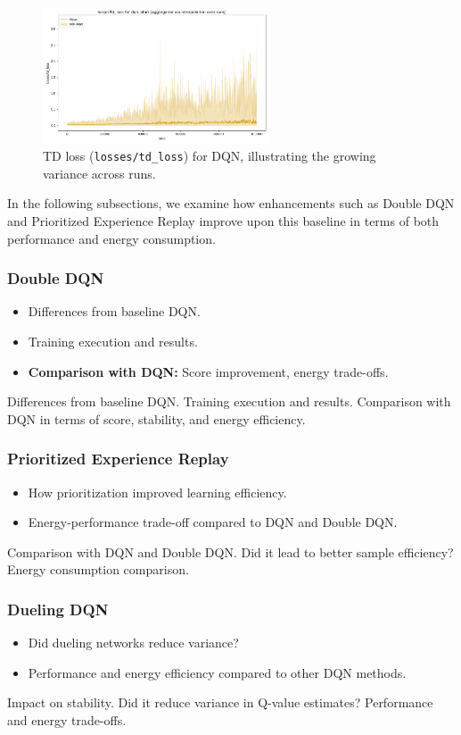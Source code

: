 \begin{figure}[htbp]
	\centering
	\includegraphics[width=0.6\textwidth]{figures/losses_td_loss_dqn_atari.png}
	\caption{TD loss (\texttt{losses/td\_loss}) for DQN, illustrating the growing variance across runs.}
	\label{fig:dqn_td_loss}
\end{figure}

\noindent In the following subsections, we examine how enhancements such as Double DQN and Prioritized Experience Replay improve upon this baseline in terms of both performance and energy consumption.


\subsubsection{Double DQN}
\label{subsubsec:ddqn}
\begin{itemize}
	\item Differences from baseline DQN.
	\item Training execution and results.
	\item \textbf{Comparison with DQN:} Score improvement, energy trade-offs.
\end{itemize}
Differences from baseline DQN.
Training execution and results.
Comparison with DQN in terms of score, stability, and energy efficiency.


\subsubsection{Prioritized Experience Replay}
\begin{itemize}
	\item How prioritization improved learning efficiency.
	\item Energy-performance trade-off compared to DQN and Double DQN.
\end{itemize}
Comparison with DQN and Double DQN.
Did it lead to better sample efficiency?
Energy consumption comparison.


\subsubsection{Dueling DQN}
\begin{itemize}
	\item Did dueling networks reduce variance?
	\item Performance and energy efficiency compared to other DQN methods.
\end{itemize}
Impact on stability.
Did it reduce variance in Q-value estimates?
Performance and energy trade-offs.



